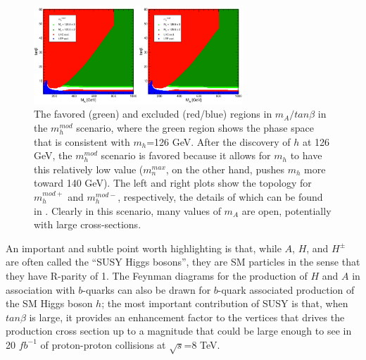 \begin{figure}
	\centering
	\includegraphics[width=0.7\textwidth]{Theory/figures/mh_mod.pdf}
	\caption{The favored (green) and excluded (red/blue) regions in 
    $m_A/tan\beta$ in the $m_h^{mod}$ scenario, where the green 
    region shows the phase space that is consistent with $m_h$=126 GeV.  
    After the discovery of $h$ at 126 GeV, the $m_h^{mod}$ 
    scenario is favored because it allows for $m_h$ to have 
    this relatively low value ($m_n^{max}$, on the other 
    hand, pushes $m_h$ more toward 140 GeV).  The 
    left and right plots show the topology for $m_h^{mod+}$ 
    and $m_h^{mod-}$, respectively, the details of which 
    can be found in \cite{Carena-2}. Clearly in this 
    scenario, many values of $m_A$ are open, potentially with large cross-sections. \label{fig:mh_mod}}
\end{figure}





An important and subtle point worth highlighting is that, while 
$A$, $H$, and $H^\pm$ are often called the ``SUSY Higgs bosons'', 
they are SM particles in the sense that they have R-parity of 1.  
The Feynman diagrams for the production of $H$ and $A$ 
in association with $b$-quarks can also be drawn for 
$b$-quark associated production of the SM Higgs boson $h$; 
the most important contribution of SUSY is that, when $tan\beta$ 
is large, it provides an enhancement factor to the vertices that 
drives the production cross section up to a magnitude that could be 
large enough to see in 20 $fb^{-1}$ of proton-proton collisions at $\sqrt{s}$=8 TeV.

